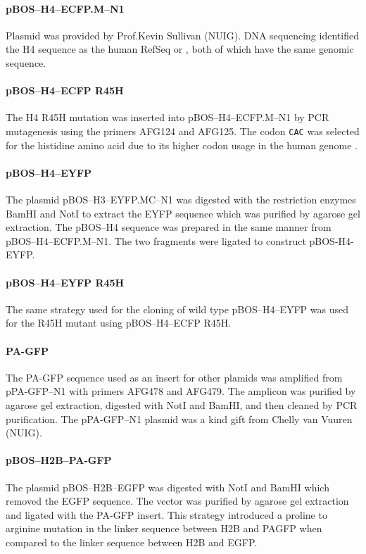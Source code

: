       \paragraph{pBOS--H4--ECFP.M--N1}
      Plasmid was provided by Prof.\@ Kevin Sullivan (NUIG).  DNA
      sequencing identified the H4 sequence as the human RefSeq
       or , both of which have the same
      genomic sequence.

      \paragraph{pBOS--H4--ECFP R45H}
      The H4 R45H mutation was inserted into pBOS--H4--ECFP.M--N1 by
      PCR mutagenesis using the primers AFG124 and AFG125. The codon
      \texttt{CAC} was selected for the histidine amino acid due to
      its higher codon usage in the human genome \citep{codon_usage}.

      \paragraph{pBOS--H4--EYFP}
      The plasmid pBOS--H3--EYFP.MC--N1 was digested with the
      restriction enzymes BamHI and NotI to extract the EYFP sequence
      which was purified by agarose gel extraction.  The pBOS--H4
      sequence was prepared in the same manner from
      pBOS--H4--ECFP.M--N1.  The two fragments were ligated to
      construct pBOS-H4-EYFP.

      \paragraph{pBOS--H4--EYFP R45H}
      The same strategy used for the cloning of wild type
      pBOS--H4--EYFP was used for the R45H mutant using
      pBOS--H4--ECFP R45H.

      \paragraph{PA-GFP}
      The PA-GFP sequence used as an insert for other plamids was
      amplified from pPA-GFP--N1 with primers AFG478 and AFG479.  The
      amplicon was purified by agarose gel extraction, digested with
      NotI and BamHI, and then cleaned by PCR purification.  The
      pPA-GFP--N1 plasmid was a kind gift from Chelly van Vuuren
      (NUIG).

      \paragraph{pBOS--H2B--PA-GFP}
      The plasmid pBOS--H2B--EGFP was digested with NotI and BamHI
      which removed the EGFP sequence.  The vector was purified by
      agarose gel extraction and ligated with the PA-GFP insert.  This
      strategy introduced a proline to arginine mutation in the linker
      sequence between H2B and PAGFP when compared to the linker
      sequence between H2B and EGFP.

